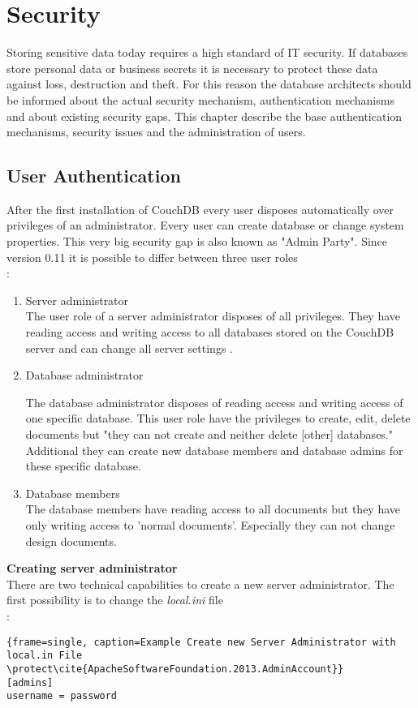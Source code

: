 \section{Security}

Storing sensitive data today requires a high standard of IT security. If databases store personal data or business secrets it is necessary to protect these data against loss, destruction and theft. For this reason the  database architects  should be informed about the actual security mechanism, authentication mechanisms and about existing security gaps. This chapter describe the base authentication mechanisms, security issues and the administration of users.

\subsection{User Authentication}
After the first installation of CouchDB every user disposes automatically over privileges of an administrator. Every user can create database or change system properties. This very big security gap is also known as "Admin Party". Since version 0.11 it is possible to differ between three user roles \\ \cite{ApacheSoftwareFoundation.2013.SecurityFeatures}:
\begin{enumerate}
\item Server administrator \\
The user role of a server administrator disposes of all privileges. They have reading access and writing access to all databases stored on the CouchDB server and can change all server settings \cite{Anderson.2010.Buch}.
\item Database administrator

The database administrator disposes of reading access and writing access of one specific database. This user role have the privileges to create, edit, delete documents but "they can not create and neither delete [other] databases." \cite{ApacheSoftwareFoundation.2013.SecurityFeatures}
Additional they can create new database members and database admins for these specific database.
\item Database members \\
The database members have reading access to all documents but they have only writing access to 'normal documents'. Especially they can not change design documents.
\end{enumerate}
\textbf{Creating server administrator}\\
There are two technical capabilities to create a new server administrator. The first possibility is to change the \textit{local.ini} file \\ \cite{ApacheSoftwareFoundation.2013.AdminAccount}:
\begin{lstlisting}{frame=single, caption=Example Create new Server Administrator with local.in File \protect\cite{ApacheSoftwareFoundation.2013.AdminAccount}}
[admins]
username = password
\end{lstlisting}

